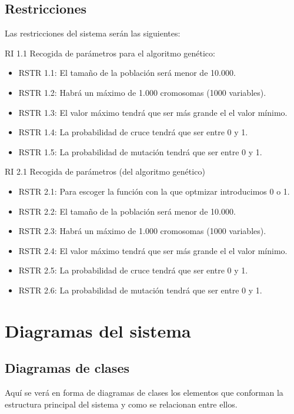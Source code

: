 \subsection{Restricciones}

\bigskip
Las restricciones del sistema serán las siguientes:

\bigskip
RI 1.1 Recogida de parámetros para el algoritmo genético:

\begin{itemize}
	\item RSTR 1.1: El tamaño de la población será menor de 10.000.
	\item RSTR 1.2: Habrá un máximo de 1.000 cromosomas (1000 variables).
	\item RSTR 1.3: El valor máximo tendrá que ser más grande el el valor mínimo.
	\item RSTR 1.4: La probabilidad de cruce tendrá que ser entre 0 y 1.
	\item RSTR 1.5: La probabilidad de mutación tendrá que ser entre 0 y 1.
\end{itemize}


\bigskip
RI 2.1 Recogida de parámetros (del algoritmo genético)

\begin{itemize}
	\item RSTR 2.1: Para escoger la función con la que optmizar introducimos 0 o 1.
	\item RSTR 2.2: El tamaño de la población será menor de 10.000.
	\item RSTR 2.3: Habrá un máximo de 1.000 cromosomas (1000 variables).
	\item RSTR 2.4: El valor máximo tendrá que ser más grande el el valor mínimo.
	\item RSTR 2.5: La probabilidad de cruce tendrá que ser entre 0 y 1.
	\item RSTR 2.6: La probabilidad de mutación tendrá que ser entre 0 y 1.
\end{itemize}


\newpage
\section{Diagramas del sistema}

\bigskip
\subsection{Diagramas de clases}
\bigskip

Aquí se verá en forma de diagramas de clases los elementos que conforman la estructura principal del sistema y como se relacionan entre ellos.


